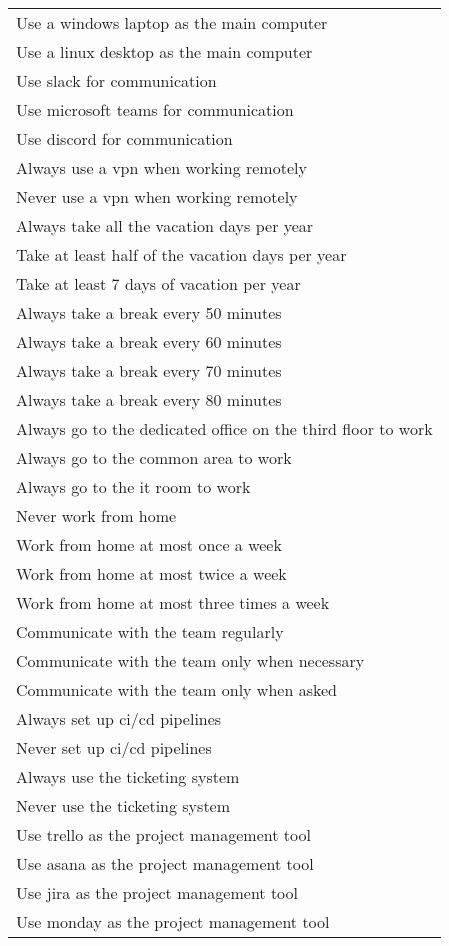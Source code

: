 \begin{xltabular}{\linewidth}{X}
Use a windows laptop as the main computer \\
Use a linux desktop as the main computer \\
\midrule
Use slack for communication \\
Use microsoft teams for communication \\
Use discord for communication \\
\midrule
Always use a vpn when working remotely \\
Never use a vpn when working remotely \\
\midrule
Always take all the vacation days per year \\
Take at least half of the vacation days per year \\
Take at least 7 days of vacation per year \\
\midrule
Always take a break every 50 minutes \\
Always take a break every 60 minutes \\
Always take a break every 70 minutes \\
Always take a break every 80 minutes \\
\midrule
Always go to the dedicated office on the third floor to work \\
Always go to the common area to work \\
Always go to the it room to work \\
\midrule
Never work from home \\
Work from home at most once a week \\
Work from home at most twice a week \\
Work from home at most three times a week \\
\midrule
Communicate with the team regularly \\
Communicate with the team only when necessary \\
Communicate with the team only when asked \\
\midrule
Always set up ci/cd pipelines \\
Never set up ci/cd pipelines \\
\midrule
Always use the ticketing system \\
Never use the ticketing system \\
\midrule
Use trello as the project management tool \\
Use asana as the project management tool \\
Use jira as the project management tool \\
Use monday as the project management tool \\

\end{xltabular}
